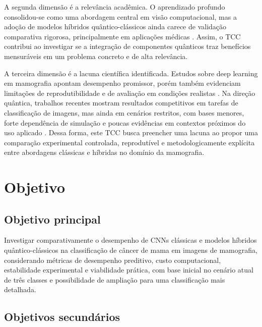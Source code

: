 \documentclass[
    12pt,
    openright,
    oneside,
    a4paper,
    english,
    brazil
]{abntex2}
\begin{document}
A segunda dimensão é a relevância acadêmica. O aprendizado profundo consolidou-se como uma abordagem central em visão computacional, mas a adoção de modelos híbridos quântico-clássicos ainda carece de validação comparativa rigorosa, principalmente em aplicações médicas \cite{LeCun2015,Gupta2025QMLDigitalHealth}. Assim, o TCC contribui ao investigar se a integração de componentes quânticos traz benefícios mensuráveis em um problema concreto e de alta relevância.

A terceira dimensão é a lacuna científica identificada. Estudos sobre deep learning em mamografia apontam desempenho promissor, porém também evidenciam limitações de reprodutibilidade e de avaliação em condições realistas \cite{Bhalla2023MammographyReview}. Na direção quântica, trabalhos recentes mostram resultados competitivos em tarefas de classificação de imagens, mas ainda em cenários restritos, com bases menores, forte dependência de simulação e poucas evidências em contextos próximos do uso aplicado \cite{Long2025QCQCNN}. Dessa forma, este TCC busca preencher uma lacuna ao propor uma comparação experimental controlada, reprodutível e metodologicamente explícita entre abordagens clássicas e híbridas no domínio da mamografia.

\section{Objetivo}
\label{sec:objetivo}


\subsection{Objetivo principal}
\label{subsec:objetivo_principal}

Investigar comparativamente o desempenho de CNNs clássicas e modelos híbridos quântico-clássicos na classificação de câncer de mama em imagens de mamografia, considerando métricas de desempenho preditivo, custo computacional, estabilidade experimental e viabilidade prática, com base inicial no cenário atual de três classes e possibilidade de ampliação para uma classificação mais detalhada.

\subsection{Objetivos secundários}
\label{subsec:objetivos_secundarios}
\end{document}
